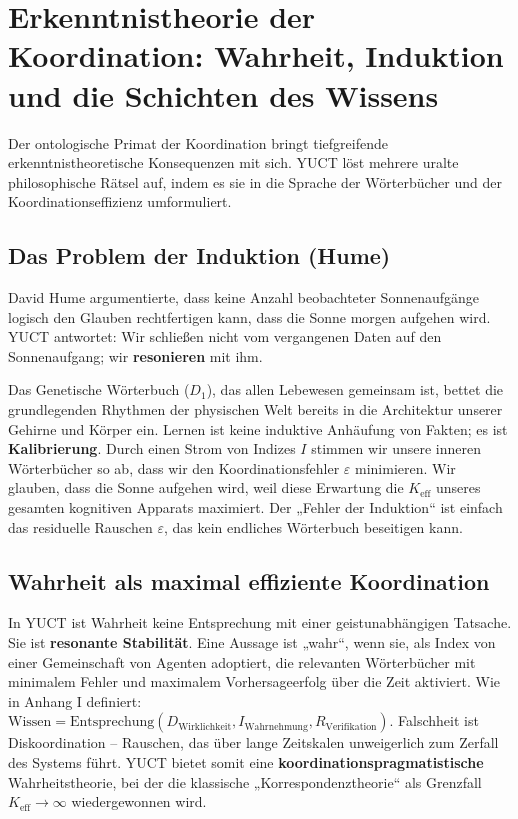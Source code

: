 \documentclass[12pt,a4paper]{article}
\newcommand{\Keff}{K_{\mathrm{eff}}}
\begin{document}
	\section{Erkenntnistheorie der Koordination: Wahrheit, Induktion und die Schichten des Wissens}
	\label{sec:epistemology}
	
	Der ontologische Primat der Koordination bringt tiefgreifende erkenntnistheoretische Konsequenzen mit sich. YUCT löst mehrere uralte philosophische Rätsel auf, indem es sie in die Sprache der Wörterbücher und der Koordinationseffizienz umformuliert.
	
	\subsection{Das Problem der Induktion (Hume)}
	
	David Hume argumentierte, dass keine Anzahl beobachteter Sonnenaufgänge logisch den Glauben rechtfertigen kann, dass die Sonne morgen aufgehen wird. YUCT antwortet: Wir schließen nicht vom vergangenen Daten auf den Sonnenaufgang; wir \textbf{resonieren} mit ihm.
	
	Das Genetische Wörterbuch (\(D_1\)), das allen Lebewesen gemeinsam ist, bettet die grundlegenden Rhythmen der physischen Welt bereits in die Architektur unserer Gehirne und Körper ein. Lernen ist keine induktive Anhäufung von Fakten; es ist \textbf{Kalibrierung}. Durch einen Strom von Indizes \(I\) stimmen wir unsere inneren Wörterbücher so ab, dass wir den Koordinationsfehler \(\varepsilon\) minimieren. Wir glauben, dass die Sonne aufgehen wird, weil diese Erwartung die \(K_{\mathrm{eff}}\) unseres gesamten kognitiven Apparats maximiert. Der „Fehler der Induktion“ ist einfach das residuelle Rauschen \(\varepsilon\), das kein endliches Wörterbuch beseitigen kann.
	
	\subsection{Wahrheit als maximal effiziente Koordination}
	
	In YUCT ist Wahrheit keine Entsprechung mit einer geistunabhängigen Tatsache. Sie ist \textbf{resonante Stabilität}. Eine Aussage ist „wahr“, wenn sie, als Index von einer Gemeinschaft von Agenten adoptiert, die relevanten Wörterbücher mit minimalem Fehler und maximalem Vorhersageerfolg über die Zeit aktiviert. Wie in Anhang I definiert: \(\text{Wissen} = \text{Entsprechung}(D_{\text{Wirklichkeit}}, I_{\text{Wahrnehmung}}, R_{\text{Verifikation}})\). Falschheit ist Diskoordination – Rauschen, das über lange Zeitskalen unweigerlich zum Zerfall des Systems führt. YUCT bietet somit eine \textbf{koordinationspragmatistische} Wahrheitstheorie, bei der die klassische „Korrespondenztheorie“ als Grenzfall \(\Keff \to \infty\) wiedergewonnen wird.
	
\end{document}
